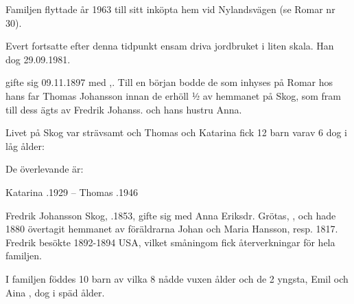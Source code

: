 Familjen flyttade år 1963 till sitt inköpta hem vid Nylandsvägen (se Romar nr 30).

Evert fortsatte efter denna tidpunkt ensam driva jordbruket i liten skala. Han dog 29.09.1981.


 gifte sig 09.11.1897 med ,. Till en början bodde de som inhyses på Romar hos hans far Thomas Johansson innan de erhöll ½ av hemmanet på Skog, som fram till dess ägts av Fredrik Johanss. och hans hustru Anna.

Livet på Skog var strävsamt och Thomas och Katarina fick 12 barn varav 6 dog i låg ålder:
\begin{jhchildren}
  \item {}
  \item {}
  \item {}
  \item {}
  \item {}
  \item {}
  De överlevande är:
  \item {}
  \item {}
  \item {}
  \item {}
  \item {}
  \item {}
\end{jhchildren}

Katarina .1929 -- Thomas .1946

Fredrik Johansson Skog, .1853, gifte sig med Anna Eriksdr. Grötas,  , och hade 1880 övertagit hemmanet av föräldrarna Johan och Maria Hansson,  resp. 1817. Fredrik besökte 1892-1894 USA, vilket småningom fick återverkningar för hela familjen.

I familjen föddes 10 barn av vilka 8 nådde vuxen ålder och de 2 yngsta, Emil  och Aina , dog i späd ålder.
\begin{jhchildren}
  \item {}
  \item {}
  \item {}
  \item {}
  \item {}
  \item {}
  \item {}
  \item {}
\end{jhchildren}

